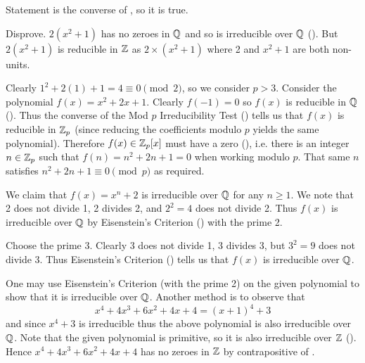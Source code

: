 \begin{questions}
    \item \begin{partquestions}{\alph*}
        \item Statement is the converse of , so it is true.
        \item Disprove. $2(x^2+1)$ has no zeroes in $\mathbb{Q}$ and so is irreducible over $\mathbb{Q}$ (). But $2(x^2+1)$ is reducible in $\mathbb{Z}$ as $2 \times (x^2 + 1)$ where 2 and $x^2 + 1$ are both non-units.
    \end{partquestions}

    \item Clearly $1^2 + 2(1) + 1 = 4 \equiv 0 \pmod2$, so we consider $p > 3$. Consider the polynomial $f(x) = x^2 + 2x + 1$. Clearly $f(-1) = 0$ so $f(x)$ is reducible in $\mathbb{Q}$ (). Thus the converse of the Mod $p$ Irreducibility Test () tells us that $f(x)$ is reducible in $\mathbb{Z}_p$ (since reducing the coefficients modulo $p$ yields the same polynomial). Therefore $f(x) \in \mathbb{Z}_p[x]$ must have a zero (), i.e. there is an integer $n \in \mathbb{Z}_p$ such that $f(n) = n^2 + 2n + 1 = 0$ when working modulo $p$. That same $n$ satisfies $n^2 + 2n + 1 \equiv 0 \pmod{p}$ as required.

    \item We claim that $f(x) = x^n + 2$ is irreducible over $\mathbb{Q}$ for any $n \geq 1$. We note that 2 does not divide 1, 2 divides 2, and $2^2 = 4$ does not divide 2. Thus $f(x)$ is irreducible over $\mathbb{Q}$ by Eisenstein's Criterion () with the prime 2.

    \item \begin{partquestions}{\roman*}
        \item Choose the prime 3. Clearly 3 does not divide 1, 3 divides 3, but $3^2 = 9$ does not divide 3. Thus Eisenstein's Criterion () tells us that $f(x)$ is irreducible over $\mathbb{Q}$.

        \item One may use Eisenstein's Criterion (with the prime 2) on the given polynomial to show that it is irreducible over $\mathbb{Q}$. Another method is to observe that
        \[
            x^4 + 4x^3 + 6x^2 + 4x + 4 = (x+1)^4 + 3
        \]
        and since $x^4 + 3$ is irreducible thus the above polynomial is also irreducible over $\mathbb{Q}$. Note that the given polynomial is primitive, so it is also irreducible over $\mathbb{Z}$ (). Hence $x^4 + 4x^3 + 6x^2 + 4x + 4$ has no zeroes in $\mathbb{Z}$ by contrapositive of .


\end{partquestions}
\end{questions}
